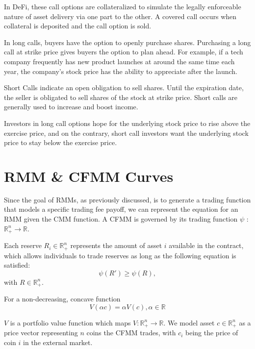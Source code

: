 \documentclass[12pt]{article}
\begin{document}
In DeFi, these call options are collateralized to simulate the legally enforceable nature of asset delivery via one part to the other. A covered call occurs when collateral is deposited and the call option is sold. 

In long calls, buyers have the option to openly purchase shares. Purchasing a long call at strike price gives buyers the option to plan ahead. For example, if a tech company frequently has new product launches at around the same time each year, the company’s stock price has the ability to appreciate after the launch. 

Short Calls indicate an open obligation to sell shares. Until the expiration date, the seller is obligated to sell shares of the stock at strike price. Short calls are generally used to increase and boost income. 

Investors in long call options hope for the underlying stock price to rise above the exercise price, and on the contrary, short call investors want the underlying stock price to stay below the exercise price. 


\section{RMM \& CFMM Curves}
Since the goal of RMMs, as previously discussed, is to generate a trading function that models a specific trading fee payoff, we can represent the equation for an RMM given the CMM function. A CFMM is governed by its trading function \(\psi \) : \(\mathbb{R}^n_+ \to \mathbb{R}\).

Each reserve \( R_i \in \mathbb{R}^n_+ \) represents the amount of asset \(i\) available in the contract, which allows individuals to trade reserves as long as the following equation is satisfied: 
\[ \psi(R') \geq \psi(R), 
    \] with \(R \in \mathbb{R}^n_+\).

    For a non-decreasing, concave function
    \[V(\alpha c) = \alpha V(c), \alpha\in\mathbb{R}
        \]
    
    \(V\) is a portfolio value function which maps \(V: \mathbb{R}^n_+ \to \mathbb{R}\). We model asset \(c \in \mathbb{R}^n_+\) as a price vector representing \(n\) coins the CFMM trades, with \(c_i\) being the price of coin \(i\) in the external market. 
\end{document}
